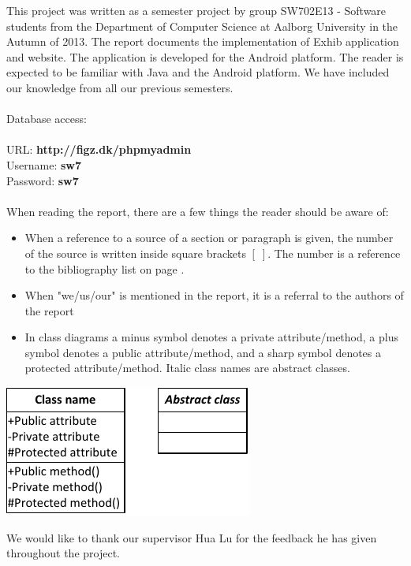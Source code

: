 This project was written as a semester project by group SW702E13 - Software students from the Department of Computer Science at Aalborg University in the Autumn of 2013. The report documents the implementation of Exhib application and website. The application is developed for the Android platform. The reader is expected to be familiar with Java and the Android platform. We have included our knowledge from all our previous semesters.
\\\\
Database access:\\\\
URL: \textbf{http://figz.dk/phpmyadmin}\\
Username: \textbf{sw7}\\
Password: \textbf{sw7}\\\\
When reading the report, there are a few things the reader should be aware of:
\begin{itemize}
\item When a reference to a source of a section or paragraph is given, the number of the source is written inside square brackets $[\;]$. The number is a reference to the bibliography list on page \pageref{chap:bib}.
\item When "we/us/our" is mentioned in the report, it is a referral to the authors of the report
\item In class diagrams a minus symbol denotes a private attribute/method, a plus symbol denotes a public attribute/method, and a sharp symbol denotes a protected attribute/method. Italic class names are abstract classes.
\end{itemize}
\begin{center}
\includegraphics[width=0.35\linewidth]{img/umltheory.pdf}
\end{center}
We would like to thank our supervisor Hua Lu for the feedback he has given throughout the project.
